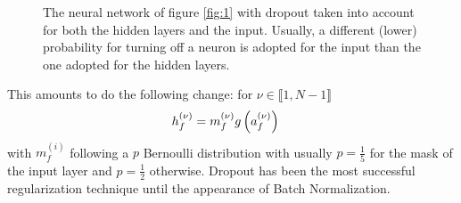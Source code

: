 \begin{figure}[H]
\begin{center}
\caption{\label{fig:2}The neural network of figure \ref{fig:1} with dropout taken into account for both the hidden layers and the input. Usually, a different (lower) probability for turning off a neuron is adopted for the input than the one adopted for the hidden layers.}
\end{center}
\end{figure}


This amounts to do the following change: for $\nu\in \llbracket 1,N-1\rrbracket$
\begin{align}
h^{(\nu)}_{f}=\null&m_f^{(\nu)} g\left(a_f^{(\nu)}\right)
\end{align}
with $m_f^{(i)}$ following a $p$ Bernoulli distribution with usually $p=\frac15$ for the mask of the input layer and $p=\frac12$ otherwise. Dropout\cite{Srivastava:2014:DSW:2627435.2670313} has been the most successful regularization technique until the appearance of Batch Normalization.

